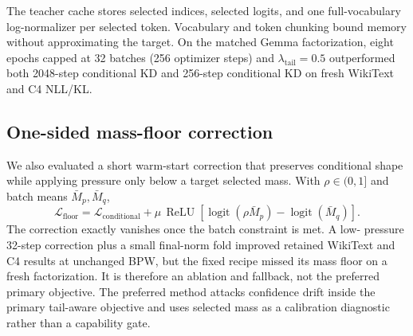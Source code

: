 \documentclass[10pt]{article}
\begin{document}
The teacher cache stores selected indices, selected logits, and one
full-vocabulary log-normalizer per selected token. Vocabulary and token
chunking bound memory without approximating the target. On the matched Gemma
factorization, eight epochs capped at 32 batches (256 optimizer steps) and
$\lambda_{\mathrm{tail}}=0.5$ outperformed both 2048-step conditional KD and
256-step conditional KD on fresh WikiText and C4 NLL/KL.

\subsection{One-sided mass-floor correction}

We also evaluated a short warm-start correction that preserves conditional
shape while applying pressure only below a target selected mass. With
$\rho\in(0,1]$ and batch means $\bar M_p,\bar M_q$,
\[
 \mathcal L_{\mathrm{floor}}=
 \mathcal L_{\mathrm{conditional}}+\mu\,
 \operatorname{ReLU}\!\left[
 \operatorname{logit}(\rho\bar M_p)-\operatorname{logit}(\bar M_q)
 \right].
 \tag{15}
\]
The correction exactly vanishes once the batch constraint is met. A low-
pressure 32-step correction plus a small final-norm fold improved retained
WikiText and C4 results at unchanged BPW, but the fixed recipe missed its mass
floor on a fresh factorization. It is therefore an ablation and fallback, not
the preferred primary objective. The preferred method attacks confidence drift
inside the primary tail-aware objective and uses selected mass as a calibration
diagnostic rather than a capability gate.

\begin{center}
\end{center}
\end{document}
